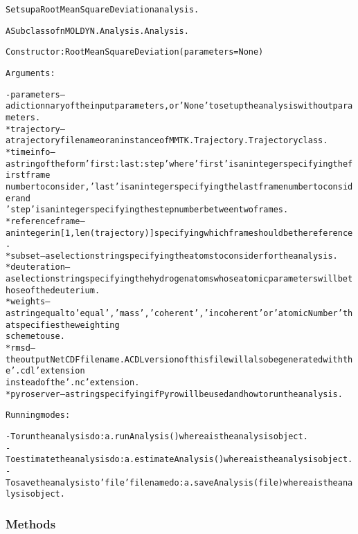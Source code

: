 \begin{alltt}
Sets up a Root Mean Square Deviation analysis.

A Subclass of nMOLDYN.Analysis.Analysis. 

Constructor: RootMeanSquareDeviation({\textbar}parameters{\textbar} = None)

Arguments:

    - {\textbar}parameters{\textbar} -- a dictionnary of the input parameters, or 'None' to set up the analysis without parameters.
        * trajectory     -- a trajectory file name or an instance of MMTK.Trajectory.Trajectory class.
        * timeinfo       -- a string of the form 'first:last:step' where 'first' is an integer specifying the first frame 
                            number to consider, 'last' is an integer specifying the last frame number to consider and 
                            'step' is an integer specifying the step number between two frames.
        * referenceframe -- an integer in [1,len(trajectory)] specifying which frame should be the reference.
        * subset         -- a selection string specifying the atoms to consider for the analysis.
        * deuteration    -- a selection string specifying the hydrogen atoms whose atomic parameters will be those of the deuterium.
        * weights        -- a string equal to 'equal', 'mass', 'coherent' , 'incoherent' or 'atomicNumber' that specifies the weighting
                            scheme to use.
        * rmsd           -- the output NetCDF file name. A CDL version of this file will also be generated with the '.cdl' extension
                            instead of the '.nc' extension.
        * pyroserver     -- a string specifying if Pyro will be used and how to run the analysis.
    
Running modes:

    - To run the analysis do: a.runAnalysis() where a is the analysis object.
    - To estimate the analysis do: a.estimateAnalysis() where a is the analysis object.
    - To save the analysis to 'file' file name do: a.saveAnalysis(file) where a is the analysis object.
\end{alltt}



  \subsubsection{Methods}

